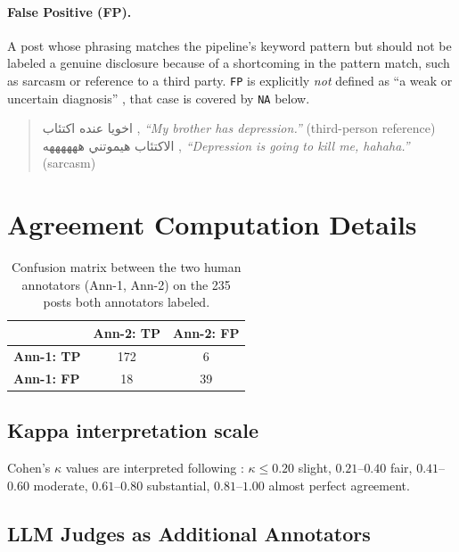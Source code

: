 \documentclass[11pt]{article}
\begin{document}
\paragraph{False Positive (FP).} A post whose phrasing matches the
pipeline's keyword pattern but should not be labeled a genuine
disclosure because of a shortcoming in the pattern match, such as
sarcasm or reference to a third party. \texttt{FP} is explicitly
\textit{not} defined as ``a weak or uncertain diagnosis'' ,  that case
is covered by \texttt{NA} below.

\begin{quote}
\foreignlanguage{arabic}{اخويا عنده اكتئاب} ,  \textit{``My brother has depression.''} (third-person reference)\\
\foreignlanguage{arabic}{الاكتئاب هيموتني ههههههه} ,  \textit{``Depression is going to kill me, hahaha.''} (sarcasm)
\end{quote}

\section{Agreement Computation Details}
\label{app:agreement_details}

\begin{table}[h]
\centering
\small
\begin{tabular}{lcc}
\toprule
 & \textbf{Ann-2: TP} & \textbf{Ann-2: FP} \\
\midrule
\textbf{Ann-1: TP} & 172 & 6 \\
\textbf{Ann-1: FP} & 18 & 39 \\
\bottomrule
\end{tabular}
\caption{Confusion matrix between the two human annotators (Ann-1,
Ann-2) on the 235 posts both annotators labeled.}
\label{tab:iaa_confusion}
\end{table}


\subsection*{Kappa interpretation scale}

Cohen's $\kappa$ values are interpreted following
\citet{landis1977measurement}: $\kappa \leq 0.20$ slight,
$0.21$--$0.40$ fair, $0.41$--$0.60$ moderate, $0.61$--$0.80$
substantial, $0.81$--$1.00$ almost perfect agreement.

\subsection*{LLM Judges as Additional Annotators}
\label{app:llm_fp_estimate}
\end{document}

